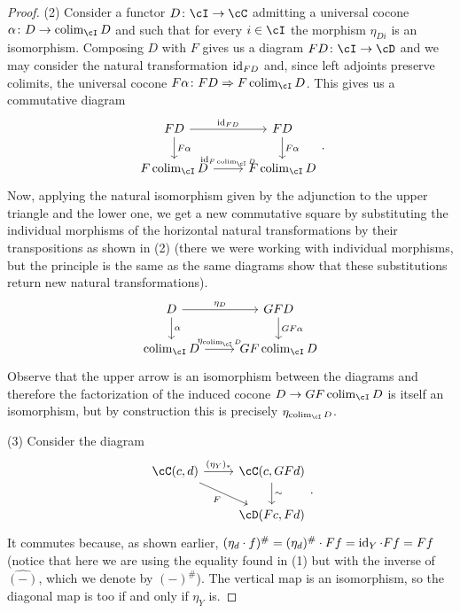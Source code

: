 \documentclass[a4paper,11pt,openany]{scrartcl}
\begin{document}
\begin{proof}
    (2) Consider a functor $D\colon\cI\rightarrow\cC$ admitting a
    universal cocone $\alpha\colon D\rightarrow\colim_{\cI}D$
    and such that for every
    $i\in\cI$ the morphism $\eta_{Di}$ is an isomorphism. Composing $D$ with
    $F$ gives us a diagram $FD\colon\cI\rightarrow\cD$ and we may
    consider the natural transformation $\operatorname{id}_{FD}$ and, since left adjoints
    preserve colimits, the universal cocone
    $F\alpha\colon FD\Rightarrow F\colim_{\cI}D$. This
    gives us a commutative diagram
    \[
        \begin{tikzcd}
            FD\ar[d, "F\alpha"]\ar[r, "\id_{FD}"]
            & FD\ar[d, "F\alpha"] \\
            F\colim_{\cI}D\ar[r, "\id_{F\colim_{\cI}D}"]
            & F\colim_{\cI}D
        \end{tikzcd}.
    \]
    Now, applying the natural isomorphism given by the adjunction to the upper
    triangle and the lower one, we get a new commutative square by substituting
    the individual morphisms of the horizontal natural transformations by their
    transpositions as shown in (2) (there we were working with individual
    morphisms, but the principle is the same as the same diagrams show that
    these substitutions return new natural transformations).
    \[
        \begin{tikzcd}
            D\ar[d, "\alpha"]\ar[r, "\eta_D"]
            & GFD\ar[d, "GF\alpha"] \\
            \colim_{\cI}D\ar[r, "\eta_{\colim_{\cI}D}"]
            & GF\colim_{\cI}D
        \end{tikzcd}
    \]
    Observe that the upper arrow is an isomorphism between the diagrams and
    therefore the factorization of the induced cocone $D\rightarrow
    GF\colim_\cI D$ is itself an isomorphism, but by construction this is
    precisely $\eta_{\colim_{\cI}D}$.

    (3) Consider the diagram
    \[
        \begin{tikzcd}
            \cC(c,d)\ar[r, "(\eta_Y)_*"]\ar[dr, swap, "F"]
            & \cC(c,GFd)\ar[d, "\sim"] \\
            & \cD(Fc,Fd)
        \end{tikzcd}.
    \]
    It commutes because, as shown earlier, $(\eta_d\cdot
    f)^\#=(\eta_d)^\#\cdot Ff=\operatorname{id}_Y\cdot Ff=Ff$ (notice that here we
    are using the equality found in (1) but with the inverse of $\hat{(-)}$,
    which we denote by $(-)^\#$). The vertical map is an isomorphism, so the
    diagonal map is too if and only if $\eta_Y$ is.


\end{proof}
\end{document}
